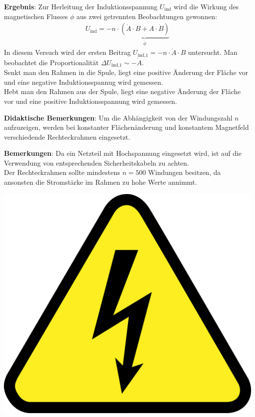 \documentclass[../main.tex]{subfiles}
\begin{document}
\begin{tcolorbox}
    \vspace{0.4cm}
    \textbf{Ergebnis}: Zur Herleitung der Induktionsspannung $U_{\text{ind}}$ wird die Wirkung des magnetischen Flusses $\phi$ aus zwei getrennten Beobachtungen gewonnen:
    \begin{align*}
        U_{\text{ind}}=-n \cdot \underbrace{(\dot{A}\cdot B+ A\cdot \dot{B})}_{\dot{\phi}}
    \end{align*}
    In diesem Versuch wird der ersten Beitrag $U_{\text{ind,1}}=-n\cdot \dot{A} \cdot B$ untersucht. Man beobachtet die Proportionalität $\Delta U_{\text{ind,1}} \sim -\dot{A}$. \\
    Senkt man den Rahmen in die Spule, liegt eine positive Änderung der Fläche vor und eine negative Induktionsspannug wird gemessen.\\
    Hebt man den Rahmen aus der Spule, liegt eine negative Änderung der Fläche vor und eine positive Induktionsspannung wird gemessen. 

    \vspace{0.4cm}
    \textbf{Didaktische Bemerkungen}: Um die Abhängigkeit von der Windungszahl $n$ aufzuzeigen, werden bei konstanter Flächenänderung und konstantem Magnetfeld verschiedende Rechteckrahmen eingesetzt.  

    \vspace{0.4cm}
    \begin{minipage}[c]{0.85\textwidth}
        \textbf{Bemerkungen}: Da ein Netzteil mit Hochspannung eingesetzt wird, ist auf die Verwendung von entsprechenden Sicherheitskabeln zu achten.\\
        Der Rechteckrahmen sollte mindestens $n=500$ Windungen besitzen, da ansonsten die Stromstärke im Rahmen zu hohe Werte annimmt.
    \end{minipage}
    \hspace{0.5cm}
    \begin{minipage}[c]{0.1\textwidth}
        \centering
        \includegraphics[width=1\textwidth]{img/hochspannung}
    \end{minipage}

\end{tcolorbox}
\end{document}
